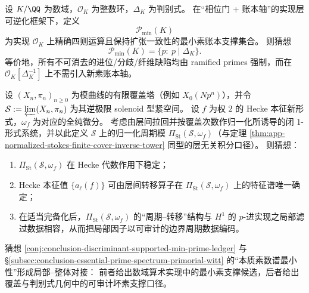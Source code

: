 \begin{conjecture}[判别式支撑的最小素账本原则]\label{conj:conclusion-discriminant-supported-min-prime-ledger}
设 \(K/\QQ\) 为数域，\(\mathcal O_K\) 为整数环，\(\Delta_K\) 为判别式。
在“相位门 + 账本轴”的实现层可逆化框架下，定义
\[
\mathcal P_{\min}(K)
\]
为实现 \(\mathcal O_K\) 上精确四则运算且保持扩张一致性的最小素账本支撑集合。
则猜想
\[
\mathcal P_{\min}(K)=\{p:\ p\mid \Delta_K\}.
\]
等价地，所有不可消去的进位/分歧/纤维缺陷均由 ramified primes 强制，而在 \(\mathcal O_K[\Delta_K^{-1}]\) 上不需引入新素账本轴。
\end{conjecture}

\begin{conjecture}\label{conj:conclusion-hecke-stokes-reciprocity-solenoid-period-spectrum}
设 \((X_n,\pi_n)_{n\ge 0}\) 为模曲线的有限覆盖塔（例如 \(X_0(Np^n)\)），并令
\(
\mathcal S:=\varprojlim (X_n,\pi_n)
\)
为其逆极限 solenoid 型紧空间。
设 \(f\) 为权 \(2\) 的 Hecke 本征新形式，\(\omega_f\) 为对应的全纯微分。
考虑由层间拉回并按覆盖次数作归一化所诱导的闭 \(1\)-形式系统，并以此定义 \(\mathcal S\) 上的归一化周期模 \(\Pi_{\mathrm{St}}(\mathcal S,\omega_f)\)（与定理 \ref{thm:app-normalized-stokes-finite-cover-inverse-tower} 同型的层无关积分口径）。
则猜想：
\begin{enumerate}
  \item \(\Pi_{\mathrm{St}}(\mathcal S,\omega_f)\) 在 Hecke 代数作用下稳定；
  \item Hecke 本征值 \(\{a_\ell(f)\}\) 可由层间转移算子在 \(\Pi_{\mathrm{St}}(\mathcal S,\omega_f)\) 上的特征谱唯一确定；
  \item 在适当完备化后，\(\Pi_{\mathrm{St}}(\mathcal S,\omega_f)\) 的“周期--转移”结构与 \(H^1\) 的 \(p\)-进实现之局部滤过数据相容，从而把局部因子以可审计的边界周期数据编码。
\end{enumerate}
\end{conjecture}

\begin{remark}[与本质素数谱口径的对接]\label{rem:conclusion-discriminant-ledger-interface}
猜想 \ref{conj:conclusion-discriminant-supported-min-prime-ledger} 与
\S\ref{subsec:conclusion-essential-prime-spectrum-primorial-witt} 的“本质素数谱最小性”形成局部--整体对接：
前者给出数域算术实现中的最小素支撑候选，后者给出覆盖与判别式几何中的可审计坏素支撑口径。
\end{remark}
